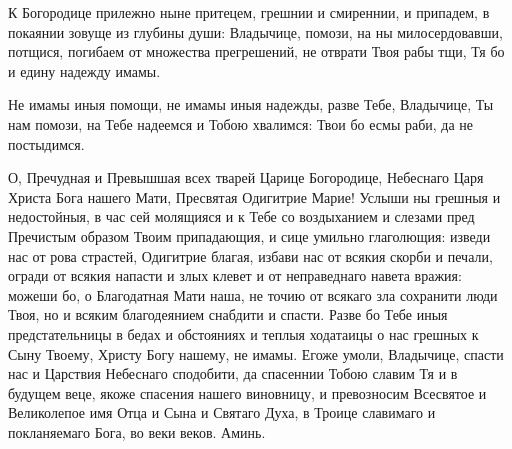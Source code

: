 \mychapterending

\begin{mymulticols}



К Богородице прилежно ныне притецем, грешнии и смиреннии, и припадем, в покаянии зовуще из глубины души: Владычице, помози, на ны милосердовавши, потщися, погибаем от множества прегрешений, не отврати Твоя рабы тщи, Тя бо и едину надежду имамы.


Не имамы иныя помощи, не имамы иныя надежды, разве Тебе, Владычице, Ты нам помози, на Тебе надеемся и Тобою хвалимся: Твои бо есмы раби, да не постыдимся.


О, Пречудная и Превышшая всех тварей Царице Богородице, Небеснаго Царя Христа Бога нашего Мати, Пресвятая Одигитрие Марие! Услыши ны грешныя и недостойныя, в час сей молящияся и к Тебе со воздыханием и слезами пред Пречистым образом Твоим припадающия, и сице умильно глаголющия: изведи нас от рова страстей, Одигитрие благая, избави нас от всякия скорби и печали, огради от всякия напасти и злых клевет и от неправеднаго навета вражия: можеши бо, о Благодатная Мати наша, не точию от всякаго зла сохранити люди Твоя, но и всяким благодеянием снабдити и спасти. Разве бо Тебе иныя предстательницы в бедах и обстояниях и теплыя ходатаицы о нас грешных к Сыну Твоему, Христу Богу нашему, не имамы. Егоже умоли, Владычице, спасти нас и Царствия Небеснаго сподобити, да спасеннии Тобою славим Тя и в будущем веце, якоже спасения нашего виновницу, и превозносим Всесвятое и Великолепое имя Отца и Сына и Святаго Духа, в Троице славимаго и покланяемаго Бога, во веки веков. Аминь.

\end{mymulticols}

\mychapterending

